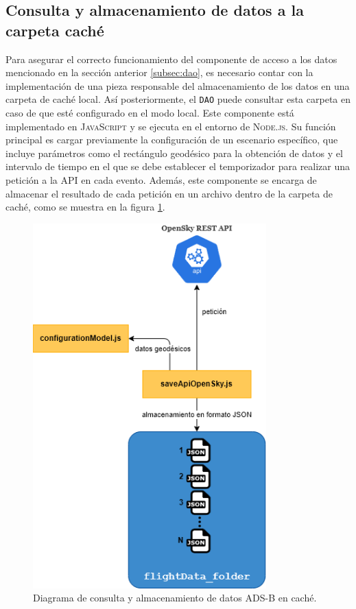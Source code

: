 \documentclass[a4paper, 11pt]{book}
\begin{document}
\subsection{Consulta y almacenamiento de datos a la carpeta caché}
\label{subsec:obtencionCache}
Para asegurar el correcto funcionamiento del componente de acceso a los datos mencionado en la sección anterior \ref{subsec:dao}, es necesario contar con la implementación de una pieza responsable del almacenamiento de los datos en una carpeta de caché local. Así posteriormente, el \texttt{\gls{DAO}} puede consultar esta carpeta en caso de que esté configurado en el modo local.
Este componente está implementado en \textsc{JavaScript} y se ejecuta en el entorno de \textsc{Node.js}. Su función principal es cargar previamente la configuración de un escenario específico, que incluye parámetros como el rectángulo geodésico para la obtención de datos y el intervalo de tiempo en el que se debe establecer el temporizador para realizar una petición a la \textsc{API} en cada evento. Además, este componente se encarga de almacenar el resultado de cada petición en un archivo dentro de la carpeta de caché, como se muestra en la figura \ref{fig:saveApiData}.
\begin{figure}[h]
  \centering
  \includegraphics[width=9cm, keepaspectratio]{img/almacenamientoCache.drawio.png}
  \caption{Diagrama de consulta y almacenamiento de datos ADS-B en caché.}
  \label{fig:saveApiData}
\end{figure}
\end{document}

